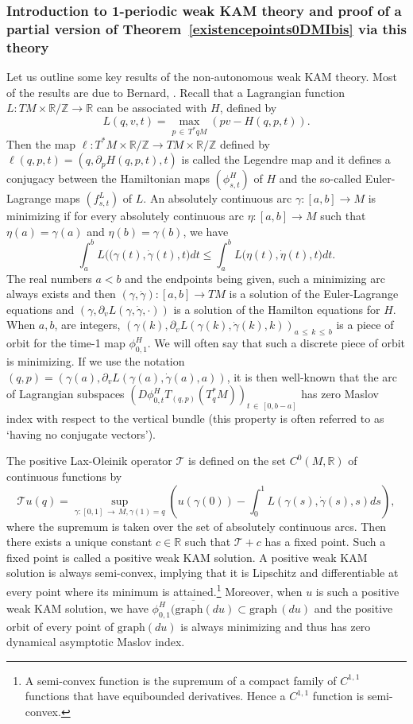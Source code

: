 \documentclass[AHL, Unicode, longabstracts, published]{cedram}
\newcommand*\cT{\mathcal{T}}
\newcommand{\Graph}{\mathrm{graph}}
\newcommand*\R{\mathbb{R}}
\newcommand*\Z{\mathbb{Z}}
\begin{document}
\subsubsection{Introduction to 1-periodic weak KAM theory and proof of a partial version of Theorem~\ref{existencepoints0DMIbis} via this theory}

Let us outline some key results of the non-autonomous weak KAM theory. Most of the results are due to Bernard, \cite{Bernard08}.\newline
Recall that a Lagrangian function $L:TM\times \R/\Z\to\R$ can be associated with $H$, defined by
\[
L(q, v,t)=\max_{p\,\in\,T^*qM}\left(pv-H(q,p,t)\right).
\]
Then the map ${\ell}:T^*M\times \R/\Z\to TM\times\R/\Z$ defined by ${\ell}(q, p,t)=(q, \partial_pH(q,p,t),t)$ is called the Legendre map and it defines a conjugacy between the Hamiltonian maps $(\phi^H_{s,t})$ of $H$ and the so-called Euler-Lagrange maps $(f^L_{s,t})$ of $L$.\newline
An absolutely continuous arc $\gamma:[a, b]\to M$ is minimizing if for every absolutely continuous arc $\eta:[a, b]\to M$ such that $\eta(a)=\gamma(a)$ and $\eta (b)=\gamma(b)$, we have
\[
\int_a^bL\big((\gamma(t), \dot\gamma(t), t\big)dt\leq \int_a^bL\big(\eta(t), \dot\eta(t), t\big)dt.
\]
The real numbers $a<b$ and the endpoints being given, such a minimizing arc always exists and then $(\gamma, \dot\gamma):[a, b]\to TM$ is a solution of the Euler-Lagrange equations and $(\gamma, \partial_vL(\gamma,\dot\gamma, \cdot))$ is a solution of the Hamilton equations for $H$. When $a,b$, are integers, $(\gamma(k), \partial_vL(\gamma(k),\dot\gamma(k), k))_{a\,\leq\,k\,\leq\,b}$ is a piece of orbit for the time-1 map $\phi^H_{0, 1}$. We will often say that such a discrete piece of orbit is minimizing. If we use the notation $(q, p)=(\gamma(a), \partial_vL(\gamma(a),\dot\gamma(a), a))$, it is then well-known that the arc of Lagrangian subspaces $(D\phi^H_{0, t}T_{(q,p)}(T^*_qM))_{t\,\in\,[0, b-a]}$ has zero Maslov index with respect to the vertical bundle (this property is often referred to as `having no conjugate vectors').

The positive Lax-Oleinik operator $\cT$ is defined on the set $C^0(M, \R)$ of continuous functions by
\[
\cT u(q)=\sup_{\gamma:[0, 1]\,\to\,M, \gamma(1)=q} \left(u(\gamma(0))-\int_0^1L(\gamma(s), \dot\gamma(s),s)ds\right),
\]
where the supremum is taken over the set of absolutely continuous arcs. Then there exists a unique constant $c\in\R$ such that $\cT +c$ has a fixed point. Such a fixed point is called a positive weak KAM solution. A positive weak KAM solution is always semi-convex, implying that it is Lipschitz and differentiable at every point where its minimum is attained.\footnote{A semi-convex function is the supremum of a compact family of $C^{1,1}$ functions that have equibounded derivatives. Hence a $C^{1, 1}$ function is semi-convex.} Moreover, when $u$ is such a positive weak KAM solution, we have $\overline{\phi^H_{0, 1}(\Graph(du)}\subset \Graph\,(du)$ and the positive orbit of every point of $\Graph(du)$ is always minimizing and thus has zero dynamical asymptotic Maslov index.
\end{document}
